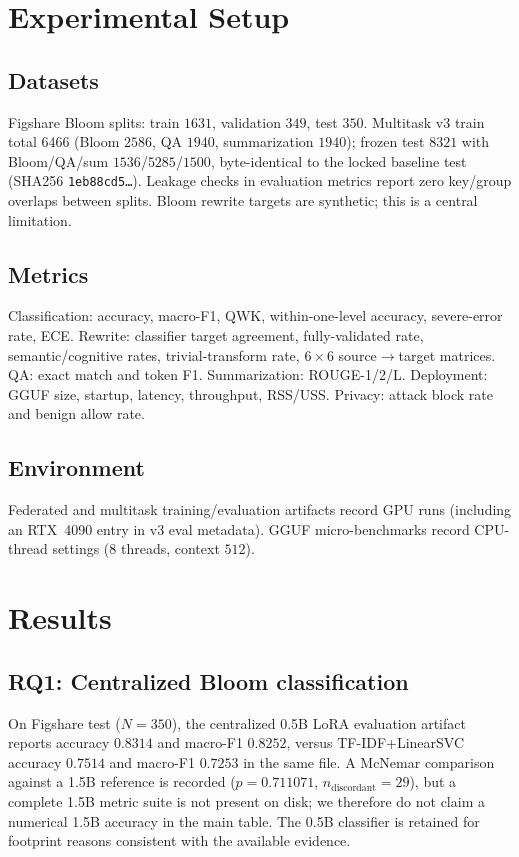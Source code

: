 \documentclass[journal]{IEEEtran}
\begin{document}
\section{Experimental Setup}

\subsection{Datasets}
Figshare Bloom splits: train $1631$, validation $349$, test $350$.
Multitask v3 train total $6466$ (Bloom $2586$, QA $1940$, summarization $1940$); frozen test $8321$ with Bloom/QA/sum $1536$/$5285$/$1500$, byte-identical to the locked baseline test (SHA256 \texttt{1eb88cd5\ldots}).
Leakage checks in evaluation metrics report zero key/group overlaps between splits.
Bloom rewrite targets are synthetic; this is a central limitation.

\subsection{Metrics}
Classification: accuracy, macro-F1, QWK, within-one-level accuracy, severe-error rate, ECE.
Rewrite: classifier target agreement, fully-validated rate, semantic/cognitive rates, trivial-transform rate, $6{\times}6$ source$\rightarrow$target matrices.
QA: exact match and token F1.
Summarization: ROUGE-1/2/L.
Deployment: GGUF size, startup, latency, throughput, RSS/USS.
Privacy: attack block rate and benign allow rate.

\subsection{Environment}
Federated and multitask training/evaluation artifacts record GPU runs (including an RTX~4090 entry in v3 eval metadata).
GGUF micro-benchmarks record CPU-thread settings ($8$ threads, context $512$).

\section{Results}

\subsection{RQ1: Centralized Bloom classification}
On Figshare test ($N{=}350$), the centralized 0.5B LoRA evaluation artifact reports accuracy $0.8314$ and macro-F1 $0.8252$, versus TF-IDF+LinearSVC accuracy $0.7514$ and macro-F1 $0.7253$ in the same file.
A McNemar comparison against a 1.5B reference is recorded ($p{=}0.711071$, $n_{\mathrm{discordant}}{=}29$), but a complete 1.5B metric suite is not present on disk; we therefore do not claim a numerical 1.5B accuracy in the main table.
The 0.5B classifier is retained for footprint reasons consistent with the available evidence.
\end{document}
